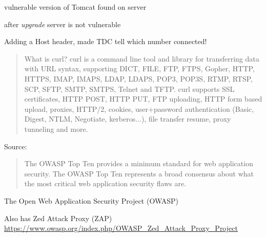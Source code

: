 \documentclass[Screen16to9,17pt]{foils}
\begin{document}

\centerline{vulnerable version of Tomcat found on server}



\centerline{after \emph{upgrade} server is not vulnerable}



Adding a Host header, made TDC tell which number connected!


\begin{quote}\footnotesize
	What is curl?
curl is a command line tool and library for transferring data with URL syntax, supporting DICT, FILE, FTP, FTPS, Gopher, HTTP, HTTPS, IMAP, IMAPS, LDAP, LDAPS, POP3, POP3S, RTMP, RTSP, SCP, SFTP, SMTP, SMTPS, Telnet and TFTP. curl supports SSL certificates, HTTP POST, HTTP PUT, FTP uploading, HTTP form based upload, proxies, HTTP/2, cookies, user+password authentication (Basic, Digest, NTLM, Negotiate, kerberos...), file transfer resume, proxy tunneling and more.
\end{quote}

Source: 




\begin{quote}
The OWASP Top Ten provides a minimum standard for web application
security. The OWASP Top Ten represents a broad consensus about what
the most critical web application security flaws are.
\end{quote}

\begin{list2}
\item The Open Web Application Security Project (OWASP) 
\item Also has Zed Attack Proxy (ZAP) \\
\url{https://www.owasp.org/index.php/OWASP_Zed_Attack_Proxy_Project}
\end{list2}


\end{document}
